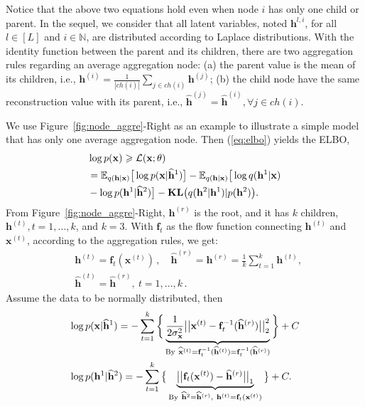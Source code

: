 \documentclass[twoside]{article}
\begin{document}
Notice that the above two equations hold even when node $i$ has only one child or parent.
In the sequel, we consider that all latent variables, noted $\mathbf{h}^{l, i}$, for all $l \in [L]$ and $i \in \mathbb{N}$, are distributed according to Laplace distributions. 
With the identity function between the  parent and its children, there are two aggregation rules regarding an average aggregation node: (a) the parent value is the mean of its children, i.e., $\mathbf{h}^{(i)} = \frac{1}{|ch(i)|} \sum_{j \in ch(i)} \mathbf{h}^{(j)}$; (b) the  child node have the same reconstruction value with its parent, i.e., $\widehat{\mathbf{h}}^{(j)} = \widehat{\mathbf{h}}^{(i)}, \forall j \in ch(i)$. 




We use Figure~\ref{fig:node_aggre}-Right as an example to illustrate a simple model that  has only one average aggregation node. Then (\ref{eq:elbo}) yields the ELBO,
\begin{align}  \label{eq:one_agg_node}
&\log p(\mathbf{x})   \geqslant  \mathcal{L}(\mathbf{x}; \theta) \\ \notag
&= \mathbb{E}_{q(\mathbf{h} | \mathbf{x})} \big[\log p(\mathbf{x}|\widehat{\mathbf{h}}^1)\big] -\mathbb{E}_{q(\mathbf{h} | \mathbf{x})} \big[\log q(\mathbf{h}^1 | \mathbf{x})\\ \notag
& -\log p(\mathbf{h}^1|\widehat{\mathbf{h}}^2)\big] - \textbf{\text{KL}}\big(q(\mathbf{h}^2 | \mathbf{h}^1) | p(\mathbf{h}^2)\big).
\end{align}%
From  Figure~\ref{fig:node_aggre}-Right,  $\mathbf{h}^{(r)}$ is the root, and it has $k$ children, $\mathbf{h}^{(t)}, t = 1,...,k$, and $k=3$. 
With $\mathbf{f}_t$ as the flow function connecting $\mathbf{h}^{(t)}$ and $\mathbf{x}^{(t)}$, according to the aggregation rules, we get:
\begin{equation}
\begin{split}
& \mathbf{h}^{(t)} = \mathbf{f}_t(\mathbf{x}^{(t)})\, ,\quad  \widehat{\mathbf{h}}^{(r)} = \mathbf{h}^{(r)} = \frac{1}{k}\sum_{t=1}^k \mathbf{h}^{(t)} , \\
&\widehat{\mathbf{h}}^{(t)}= \widehat{\mathbf{h}}^{(r)}, \ t = 1,...,k \, .
 \end{split}
 \end{equation}%
 Assume the data to be normally distributed, then 
 {\small
\begin{align}\notag
 &\log p(\mathbf{x}|\widehat{\mathbf{h}}^1) 
 =-\sum_{t=1}^k\bigg\{ \underbrace{\frac{1}{2\sigma^2_{\mathbf{x}}}\big|\big| \mathbf{x}^{(t)} - \mathbf{f}_t^{-1}(\widehat{\mathbf{h}}^{(r)})\big|\big|_2^2 }_{\textrm{By} \  \widehat{\mathbf{x}}^{(t)}=\mathbf{f}_t^{-1}(\widehat{\mathbf{h}}^{(t)})=\mathbf{f}_t^{-1}(\widehat{\mathbf{h}}^{(r)})} \bigg\}+C \\
 &  \log p(\mathbf{h}^1|\widehat{\mathbf{h}}^2) = -\sum_{t=1}^k\big\{ \underbrace{\big|\big|  \mathbf{f}_t(\mathbf{x}^{(t)}) - \widehat{\mathbf{h}}^{(r)}\big|\big|_1}_{\textrm{By} \  \widehat{\mathbf{h}}^{2}= \widehat{\mathbf{h}}^{(r)}, \  \mathbf{h}^{(t)} = \mathbf{f}_t(\mathbf{x}^{(t)})} \big\} +C .
 \end{align} 
 }
\end{document}
